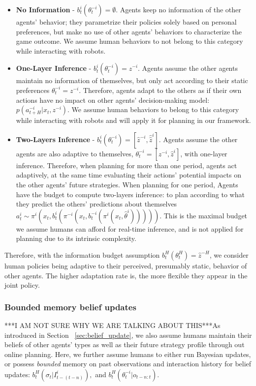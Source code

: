 \documentclass[letterpaper, 10 pt, conference]{ieeeconf}  %
\begin{document}
\begin{itemize}
	\item \textbf{No Information} - $b^i_t(\theta^{-i}_t) = \emptyset$. Agents keep no information of the other agents' behavior; they parametrize their policies solely based on personal preferences, but make no use of other agents' behaviors to characterize the game outcome. We assume human behaviors to not belong to this category while interacting with robots.
	\item \textbf{One-Layer Inference} - $b^i_t(\theta^{-i}_t) = \hat{z}^{-i}$. Agents assume the other agents maintain no information of themselves, but only act according to their static preferences $\theta^{-i}_t = z^{-i}$. Therefore, agents adapt to the others as if their own actions have no impact on other agents' decision-making model: $p(a^{-i}_{t+H}|x_t, z^{-i})$. We assume human behaviors to belong to this category while interacting with robots and will apply it for planning in our framework.
	\item \textbf{Two-Layers Inference} - $b^i_t(\theta^{-i}_t) = [\hat{z}^{-i}, \hat{\hat{z}}^i]$. Agents assume the other agents are also adaptive to themselves,
	$\theta^{-i}_t = [z^{-i}, \hat{z}^{i}]$, with one-layer inference. Therefore, when planning for more than one period, agents act adaptively, at the same time evaluating their actions' potential impacts on the other agents' future strategies. When planning for one period, Agents have the budget to compute two-layers inference: to plan according to what they predict the others' predictions about themselves $a^i_t \sim \pi^i(x_t, b^i_t(\pi^{-i}(x_t,b^{-i}_t(\pi^i(x_t,\hat{\theta}^i)))))$. This is the maximal budget we assume humans can afford for real-time inference, and is not applied for planning due to its intrinsic complexity. 
\end{itemize}

Therefore, with the information budget assumption $b^H_t(\theta^H_t) = \hat{z}^{-H}$, we consider human policies being adaptive to their perceived, presumably static, behavior of other agents. The higher adaptation rate is, the more flexible they 
appear in the joint policy. 

\color{red}\subsubsection{Bounded memory belief updates}

***I AM NOT SURE WHY WE ARE TALKING ABOUT THIS***As introduced in Section ~\ref{sec:belief_update}, we also assume humans maintain their 
beliefs of other agents' types as well as their future strategy profile through out online planning. Here, we further assume humans to either run Bayesian updates, or possess \textit{bounded} memory on past observations and interaction history for belief updates\cite{nikolaidis2016formalizing}: $b^H_t(\sigma_{t}|I^i_{t-(t-n)}),$ and $b^H_t(\theta^{-i}_t|o_{t-n:t})$.
\end{document}
